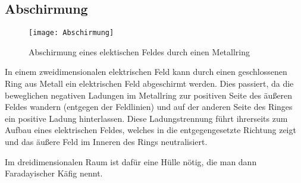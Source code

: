 \subsection{Abschirmung}

\begin{figure}[!h]
	\centering
	\texttt{[image: Abschirmung]}
	\caption{Abschirmung eines elektischen Feldes durch einen Metallring}
	\label{fig:abschrimung}
\end{figure}

In einem zweidimensionalen elektrischen Feld kann durch einen geschlossenen Ring aus Metall ein elektrischen Feld abgeschirmt werden. Dies passiert, da die beweglichen negativen Ladungen im Metallring zur positiven Seite des äußeren Feldes wandern (entgegen der Feldlinien) und auf der anderen Seite des Ringes ein positive Ladung hinterlassen. Diese Ladungstrennung führt ihrerseits zum Aufbau eines elektrischen Feldes, welches in die entgegengesetzte Richtung zeigt und das \glqq äußere\grqq{} Feld im Inneren des Rings neutralisiert.

Im dreidimensionalen Raum ist dafür eine Hülle nötig, die man dann \glqq Faradayischer Käfig\grqq{} nennt.